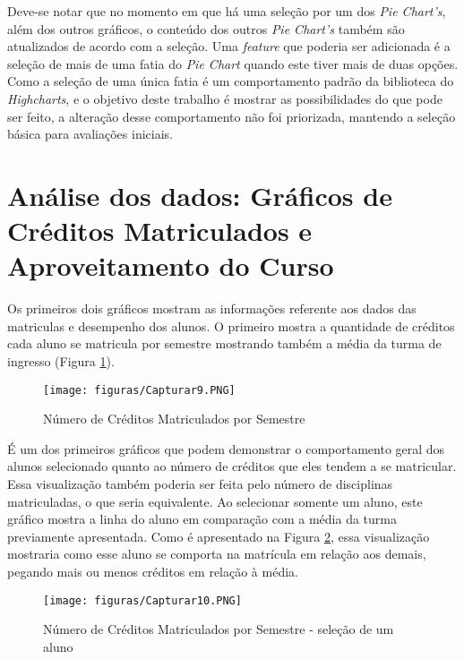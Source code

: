 \documentclass[cic,tc]{iiufrgs}
\begin{document}
Deve-se notar que no momento em que há uma seleção por um dos \textit{Pie Chart's}, além dos outros gráficos, o conteúdo dos outros \textit{Pie Chart's} também são atualizados de acordo com a seleção. Uma \textit{feature} que poderia ser adicionada é a seleção de mais de uma fatia do \textit{Pie Chart} quando este tiver mais de duas opções. Como a seleção de uma única fatia é um comportamento padrão da biblioteca do \textit{Highcharts}, e o objetivo deste trabalho é mostrar as possibilidades do que pode ser feito, a alteração desse comportamento não foi priorizada, mantendo a seleção básica para avaliações iniciais. 

\section{Análise dos dados: Gráficos de Créditos Matriculados e Aproveitamento do Curso }

Os primeiros dois gráficos mostram as informações referente aos dados das matriculas e desempenho dos alunos. O primeiro mostra a quantidade de créditos cada aluno se matricula por semestre mostrando também a média da turma de ingresso (Figura \ref{fig:numCred}).

\begin{figure} [!ht]
        \caption{Número de Créditos Matriculados por Semestre}
        \begin{center}
            \texttt{[image: figuras/Capturar9.PNG]}
        \end{center}
        
        \label{fig:numCred}
    \end{figure}

É um dos primeiros gráficos que podem demonstrar o comportamento geral dos alunos selecionado quanto ao número de créditos que eles tendem a se matricular. Essa visualização também poderia ser feita pelo número de disciplinas matriculadas, o que seria equivalente. Ao selecionar somente um aluno, este gráfico mostra a linha do aluno em comparação com a média da turma previamente apresentada. Como é apresentado na Figura \ref{fig:numCredAluno}, essa visualização mostraria como esse aluno se comporta na matrícula em relação aos demais, pegando mais ou menos créditos em relação à média.


\begin{figure} [!ht]
        \caption{Número de Créditos Matriculados por Semestre - seleção de um aluno}
        \begin{center}
            \texttt{[image: figuras/Capturar10.PNG]}
        \end{center}
        
        \label{fig:numCredAluno}
    \end{figure}
\end{document}
